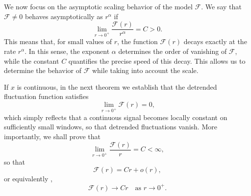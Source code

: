 \documentclass{amsart}
\begin{document}
We now focus on the asymptotic scaling behavior of the model $\mathcal F$. We say that $\mathcal{F}\neq 0$ behaves asymptotically as $r^\alpha$ if 
\begin{equation*}
\lim_{r\to 0^+}\frac{\mathcal{F}(r)}{r^\alpha}=C>0.
\end{equation*}
This means that, for small values of $r$, the function $\mathcal{F}(r)$ decays exactly at the rate $r^\alpha$. In this sense, the exponent $\alpha$ determines the order of vanishing of $\mathcal{F}$, while the constant $C$ quantifies the precise speed of this decay. This allows us to determine the behavior of $\mathcal F$ while taking into account the scale. 

If $x$ is continuous, in the next theorem we establish that the detrended fluctuation function satisfies
\[
\lim_{r\to 0^+} \mathcal F(r)=0,
\]
which simply reflects that a continuous signal becomes locally constant on sufficiently small windows, so that detrended fluctuations vanish. More importantly, we shall prove that
\[
\lim_{r\to 0^+} \frac{\mathcal F(r)}{r} = C < \infty,
\]
so that
\[
\mathcal F(r) = Cr + o(r),
\]
or equivalently ,
\[
\mathcal F(r)\to Cr \quad\text{as }r\to 0^+.
\]
\end{document}
